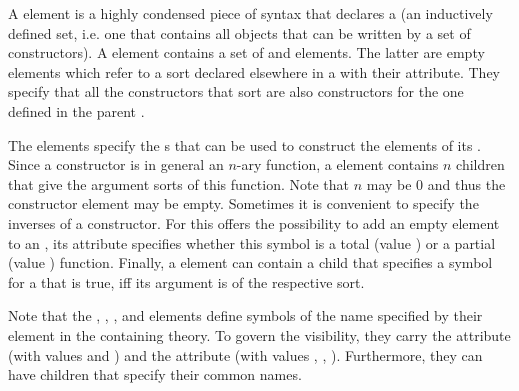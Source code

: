 A {} element is a highly condensed piece of syntax that declares a
{} (an inductively defined set, i.e. one that contains all objects
that can be written by a set of constructors). A {} element
contains a set of {} and {} elements. The
latter are empty elements which refer to a sort declared elsewhere in a
{} with their {} attribute. They specify
that all the constructors that sort are also constructors for the one defined
in the parent {}.

The {} elements specify the {s} that can be used
to construct the elements of its {}. Since a constructor is in
general an $n$-ary function, a {} element contains $n$
{} children that give the argument sorts of this function. Note
that $n$ may be 0 and thus the constructor element may be empty. Sometimes it is
convenient to specify the inverses of a constructor. For this {\omdoc} offers the
possibility to add an empty {} element to an {},
its attribute {} specifies whether this symbol is a
total (value
{}) or a partial (value
{}) function.  Finally, a {} element
can contain a {} child that specifies a symbol for a
{} that is true, iff its argument is of the respective sort.

Note that the {}, {}, {},
and {} elements define symbols of the name specified by their
{} element in the containing theory. To govern the
visibility, they carry the attribute {} (with values
{} and {}) and the
attribute {} (with values {},
{}, {}). Furthermore, they
can have {} children that specify their common names.

